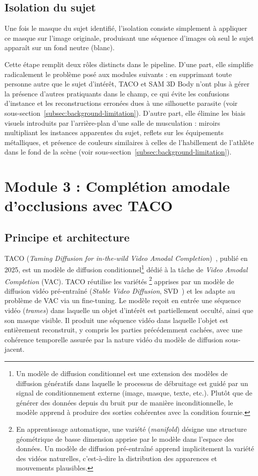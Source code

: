 \subsection{Isolation du sujet}

Une fois le masque du sujet identifié, l'isolation consiste simplement à appliquer ce masque sur l'image originale, produisant une séquence d'images où seul le sujet apparaît sur un fond neutre (blanc).

Cette étape remplit deux rôles distincts dans le pipeline. D'une part, elle simplifie radicalement le problème posé aux modules suivants : en supprimant toute personne autre que le sujet d'intérêt, TACO et SAM 3D Body n'ont plus à gérer la présence d'autres pratiquants dans le champ, ce qui évite les confusions d'instance et les reconstructions erronées dues à une silhouette parasite (voir sous-section~\ref{subsec:background-limitation}). D'autre part, elle élimine les biais visuels introduits par l'arrière-plan d'une salle de musculation : miroirs multipliant les instances apparentes du sujet, reflets sur les équipements métalliques, et présence de couleurs similaires à celles de l'habillement de l'athlète dans le fond de la scène (voir sous-section~\ref{subsec:background-limitation}).


\section{Module 3 : Complétion amodale d'occlusions avec TACO} \label{sec:module-3}

\subsection{Principe et architecture}

TACO (\emph{Taming Diffusion for in-the-wild Video Amodal Completion})~\cite{TACO-2025}, publié en 2025, est un modèle de diffusion conditionnel\footnote{Un modèle de diffusion conditionnel est une extension des modèles de diffusion génératifs dans laquelle le processus de débruitage est guidé par un signal de conditionnement externe (image, masque, texte, etc.). Plutôt que de générer des données depuis du bruit pur de manière inconditionnelle, le modèle apprend à produire des sorties cohérentes avec la condition fournie.} dédié à la tâche de \emph{Video Amodal Completion} (VAC). TACO réutilise les variétés \footnote{En apprentissage automatique, une variété (\textit{manifold}) désigne une structure géométrique de basse dimension apprise par le modèle dans l'espace des données. Un modèle de diffusion pré-entraîné apprend implicitement la variété des vidéos naturelles, c'est-à-dire la distribution des apparences et mouvements plausibles.} apprises par un modèle de diffusion vidéo pré-entraîné (\textit{Stable Video Diffusion}, SVD~\cite{SVD-2023}) et les adapte au problème de VAC via un fine-tuning. Le modèle reçoit en entrée une séquence vidéo (\textit{trames}) dans laquelle un objet d'intérêt est partiellement occulté, ainsi que son masque visible. Il produit une séquence vidéo dans laquelle l'objet est entièrement reconstruit, y compris les parties précédemment cachées, avec une cohérence temporelle assurée par la nature vidéo du modèle de diffusion sous-jacent.

